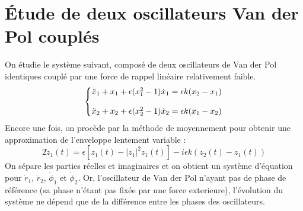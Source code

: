 \chapter{Étude de deux oscillateurs Van der Pol couplés}
%
On étudie le système suivant, composé de deux oscillateurs de Van der Pol identiques couplé par une force de rappel linéaire relativement faible.
%
\begin{equation}
  \left\{\begin{array}{@{}l@{}}
    \ddot{x}_1 + x_1  + \epsilon(x_1^2 - 1)\dot{x}_1 = \epsilon k(x_2 - x_1) \\
    \\
    \ddot{x}_2 + x_2 + \epsilon(x_2^2 - 1)\dot{x}_2 = \epsilon k(x_1 - x_2)
  \end{array}\right.\,
  \label{eq:coupled_vdp}
\end{equation}
%
Encore une fois, on procède par la méthode de moyennement pour obtenir une approximation de l'enveloppe lentement variable :
%
\begin{equation}
    2\dot{z}_1(t) = 
     \epsilon \left[ z_1(t) - |z_1|^2z_1(t) \right]
    - i\epsilon k\left( z_2(t) - z_1(t)\right)
\end{equation}
%
On sépare les parties réelles et imaginaires et on obtient un système d'équation pour $\dot{r}_1$,  $\dot{r}_2$,  $\dot{\phi}_1$ et  $\dot{\phi}_2$. %
%
%
%
%
Or, l'oscillateur de Van der Pol n'ayant pas de phase de référence (sa phase n'étant pas fixée par une force exterieure), 
l'évolution du système ne dépend que de la différence entre les phases des oscillateurs. 
